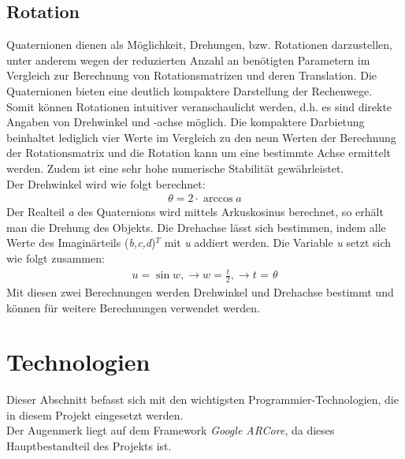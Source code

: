 \subsection{Rotation}
Quaternionen dienen als Möglichkeit, Drehungen, bzw. Rotationen darzustellen, unter anderem wegen der reduzierten Anzahl an 
benötigten Parametern im Vergleich zur Berechnung von Rotationsmatrizen und deren Translation. Die Quaternionen bieten eine deutlich kompaktere 
Darstellung der Rechenwege. Somit können Rotationen intuitiver veranschaulicht werden, d.h. es sind direkte Angaben von Drehwinkel und 
-achse möglich. Die kompaktere Darbietung beinhaltet lediglich vier Werte im Vergleich zu den neun Werten der Berechnung der Rotationsmatrix
und die Rotation kann um eine bestimmte Achse ermittelt werden. Zudem ist eine sehr hohe numerische Stabilität gewährleistet. 
\\ 
Der Drehwinkel wird wie folgt berechnet:
\begin{align}
    \textit{$\theta$} = \textit{2} \cdot \textit{$\arccos a$}
\end{align}
Der Realteil \textit{a} des Quaternions wird mittels Arkuskosinus berechnet, so erhält man die Drehung des Objekts. Die Drehachse lässt sich 
bestimmen, indem alle Werte des Imaginärteils (\textit{b,c,d})$^T$ mit \textit{u} addiert werden. Die Variable \textit{u} setzt sich wie 
folgt zusammen: 
\begin{align}
    \textit{u} = \textit{$\sin w$}, \to \textit{w} = \frac{t}{2}, \to \textit{t = $\theta$}
\end{align}
Mit diesen zwei Berechnungen werden Drehwinkel und Drehachse bestimmt und können für weitere Berechnungen verwendet werden.

\section{Technologien}
\label{chap:Technologien}
Dieser Abschnitt befasst sich mit den wichtigsten Programmier-Technologien, die in diesem Projekt eingesetzt werden. 
\\ 
Der Augenmerk liegt auf dem Framework \textit{Google ARCore}, da dieses Hauptbestandteil des Projekts ist. 
